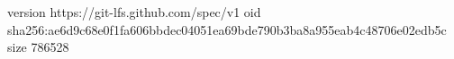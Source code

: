 version https://git-lfs.github.com/spec/v1
oid sha256:ae6d9c68e0f1fa606bbdec04051ea69bde790b3ba8a955eab4c48706e02edb5c
size 786528
